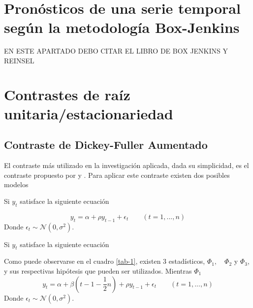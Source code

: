 \documentclass[12pt, twoside]{book}\usepackage[]{graphicx}\usepackage[]{color}
\numberwithin{equation}{section}
\numberwithin{theorem}{section}
\numberwithin{teorema}{section}
\numberwithin{defi}{section}
\numberwithin{prop}{section}
\numberwithin{defi}{section}
\theoremstyle{plain}
\begin{document}
\section{Pronósticos de una serie temporal según la metodología Box-Jenkins}

EN ESTE APARTADO DEBO CITAR EL LIBRO DE BOX JENKINS Y REINSEL

\section{Contrastes de raíz unitaria/estacionariedad}
\subsection{Contraste de Dickey-Fuller Aumentado}

El contraste más utilizado en la investigación aplicada, dada su simplicidad, es el contraste propuesto por \cite{fuller1976} y \cite{dickey1981}. Para aplicar este contraste existen dos posibles modelos 

Si $y_{t}$ satisface la siguiente ecuación

\begin{equation}
y_{t} = \alpha+\rho y_{t-1}+\epsilon_{t}\qquad (t=1,...,n)
\end{equation}
Donde $\epsilon_{t}\sim \mathcal{N}(0,\sigma^{2})$. 

Si $y_{t}$ satisface la siguiente ecuación 

Como puede observarse en el cuadro \ref{tab-1}, existen 3 estadísticos, $\Phi_{1},\quad \Phi_{2}$ y $\Phi_{3}$, y sus respectivas hipótesis que pueden ser utilizados. Mientras $\Phi_{1}$
\begin{equation}
y_{t} = \alpha+\beta\left(t-1-\frac{1}{2}n\right)+\rho y_{t-1}+\epsilon_{t}\qquad (t=1,...,n)
\end{equation}
Donde $\epsilon_{t}\sim \mathcal{N}(0,\sigma^{2})$. 
\end{document}
